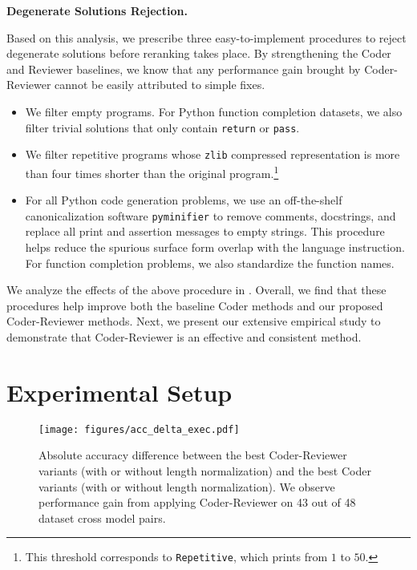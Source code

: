 \documentclass[nohyperref]{article}
\theoremstyle{plain}
\theoremstyle{definition}
\theoremstyle{remark}
\renewcommand{\paragraph}[1]{
     \textbf{#1} 
 }
\begin{document}
\paragraph{Degenerate Solutions Rejection.}
Based on this analysis, we prescribe three easy-to-implement procedures to reject degenerate solutions before reranking takes place.
By strengthening the Coder and Reviewer baselines, we know that any performance gain brought by Coder-Reviewer cannot be easily attributed to simple fixes.
\begin{itemize}
    \item We filter empty programs. For Python function completion datasets, we also filter trivial solutions that only contain \texttt{return} or \texttt{pass}.
    \item We filter repetitive programs whose \texttt{zlib} compressed representation is more than four times shorter than the original program.\footnote{This threshold corresponds to \texttt{Repetitive}, which prints from $1$ to $50$.}
    \item For all Python code generation problems, we use an off-the-shelf canonicalization software \texttt{pyminifier} to remove comments, docstrings, and replace all print and assertion messages to empty strings. This procedure helps reduce the spurious surface form overlap with the language instruction. For function completion problems, we also standardize the function names. 
\end{itemize}

We analyze the effects of the above procedure in .
Overall, we find that these procedures help improve both the baseline Coder methods and our proposed Coder-Reviewer methods. 
Next, we present our extensive empirical study to demonstrate that Coder-Reviewer is an effective and consistent method.

 \section{Experimental Setup}
\begin{figure*}[ht]
     \centering
     \texttt{[image: figures/acc\_delta\_exec.pdf]}
     \caption{Absolute accuracy difference between the best Coder-Reviewer variants (with or without length normalization) and the best Coder variants (with or without length normalization). We observe performance gain from applying Coder-Reviewer on 43 out of 48 dataset cross model pairs.}
     \label{fig:acc_delta}
     \vspace{-13pt}
\end{figure*}
\end{document}
